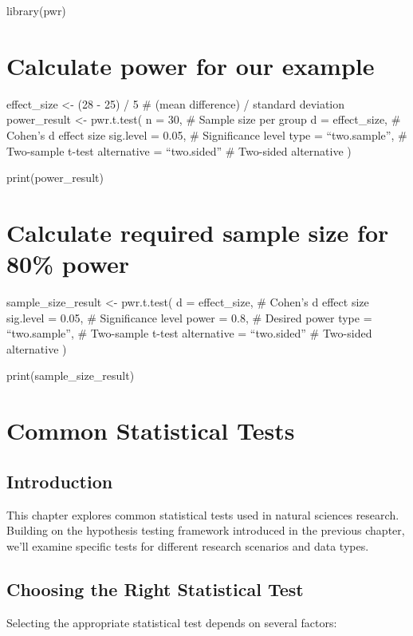 \documentclass[
  letterpaper,
]{book}
\begin{document}
library(pwr)

\chapter{Calculate power for our
example}\label{calculate-power-for-our-example}

effect\_size \textless- (28 - 25) / 5 \# (mean difference) / standard
deviation power\_result \textless- pwr.t.test( n = 30, \# Sample size
per group d = effect\_size, \# Cohen's d effect size sig.level = 0.05,
\# Significance level type = ``two.sample'', \# Two-sample t-test
alternative = ``two.sided'' \# Two-sided alternative )

print(power\_result)

\chapter{Calculate required sample size for 80\%
power}\label{calculate-required-sample-size-for-80-power}

sample\_size\_result \textless- pwr.t.test( d = effect\_size, \# Cohen's
d effect size sig.level = 0.05, \# Significance level power = 0.8, \#
Desired power type = ``two.sample'', \# Two-sample t-test alternative =
``two.sided'' \# Two-sided alternative )

print(sample\_size\_result)

\chapter{Common Statistical Tests}\label{common-statistical-tests}

\section{Introduction}\label{introduction-3}

This chapter explores common statistical tests used in natural sciences
research. Building on the hypothesis testing framework introduced in the
previous chapter, we'll examine specific tests for different research
scenarios and data types.

\section{Choosing the Right Statistical
Test}\label{choosing-the-right-statistical-test}

Selecting the appropriate statistical test depends on several factors:
\end{document}
